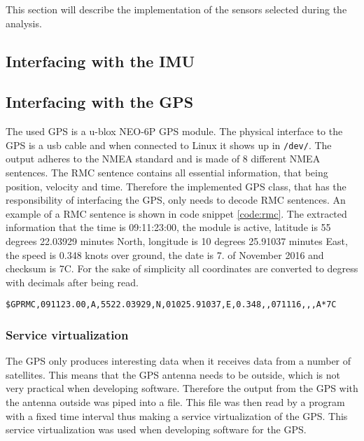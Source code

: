 \label{sub:implementation_of_sensors}
This section will describe the implementation of the sensors selected during the analysis.


\subsection{Interfacing with the IMU}\label{sec:interface_IMU}



\subsection{Interfacing with the GPS}\label{sec:interface_GPS}
The used GPS is a u-blox NEO-6P GPS module.
The physical interface to the GPS is a usb cable and when connected to Linux it shows up in \texttt{/dev/}.
The output adheres to the NMEA standard and is made of 8 different NMEA sentences.
The RMC sentence contains all essential information, that being position, velocity and time.
Therefore the implemented GPS class, that has the responsibility of interfacing the GPS, only needs to decode RMC sentences.
An example of a RMC sentence is shown in code snippet \ref{code:rmc}.
The extracted information that the time is 09:11:23:00, the module is active, latitude is 55 degrees 22.03929 minutes North, longitude is 10 degrees 25.91037 minutes East, the speed is 0.348 knots over ground, the date is 7. of November 2016 and checksum is 7C.
For the sake of simplicity all coordinates are converted to degress with decimals after being read. 

\begin{lstlisting}[caption=RMC sentence.,label=code:rmc]
$GPRMC,091123.00,A,5522.03929,N,01025.91037,E,0.348,,071116,,,A*7C
\end{lstlisting}

\subsubsection{Service virtualization}
The GPS only produces interesting data when it receives data from a number of satellites. 
This means that the GPS antenna needs to be outside, which is not very practical when developing software.
Therefore the output from the GPS with the antenna outside was piped into a file.
This file was then read by a program with a fixed time interval thus making a service virtualization of the GPS.
This service virtualization was used when developing software for the GPS.